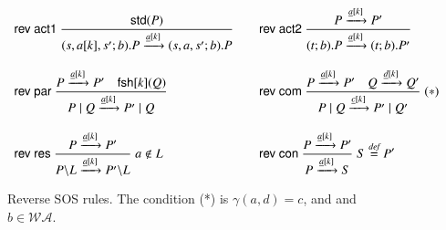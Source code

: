 \begin{figure}[t]
\[
\begin{array}{ll}
\rulename{rev act1}\
\Rule
{\std{P} %
}
{(s,a[k],s';b).P \xrightarrow{\underline{a}[k]}(s,a,s';b).P}
\quad &
%
%
%
\rulename{rev act2}\
\Rule
{P \xrightarrow{\underline{a}[k]} P' %
}
{(t;b).P \xrightarrow{\underline{a}[k]} (t;b).P'}
\\[25pt]
\rulename{rev par}\
\Rule
{P \xrightarrow{\underline{a}[k]} P'\quad \fresh{k}{Q}}
{P \paral Q \xrightarrow{\underline{a}[k]} P' \paral Q}
\quad &
\rulename{rev com}\
\Rule
{P \xrightarrow{\underline{a}[k]} P' \quad Q \xrightarrow{\underline{d}[k]} Q'}
{P \paral Q \xrightarrow{\underline{c}[k]} P' \paral Q'}
\; (*)
%
\\[25pt]
\rulename{rev res}\
\Rule
{P \xrightarrow{\underline{a}[k]} P'}
{P\backslash L \xrightarrow{\underline{a}[k]} P'\backslash L}
\; a \notin L
\quad &
\rulename{rev con}\
\Rule
{P \xrightarrow{\underline{a}[k]} P'}
{P \xrightarrow{\underline{a}[k]} S}
\; S \bydef P'
\end{array}
\]
\caption{Reverse SOS rules. The condition (*) is $\gamma(a,d)=c$, and 
and $b \in \mathcal{WA}$. %
} 
\label{fig:reversesos}
\end{figure}


